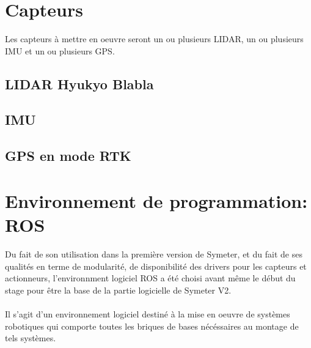 \documentclass[12pt,a4paper]{report}
\begin{document}
	\section{Capteurs}
		Les capteurs à mettre en oeuvre seront un ou plusieurs LIDAR, un ou plusieurs IMU et un ou plusieurs GPS.
		\subsection{LIDAR Hyukyo Blabla}
		
		\subsection{IMU}
		
		\subsection{GPS en mode RTK}
		
		
		
		
	\section{Environnement de programmation: ROS}
	Du fait de son utilisation dans la première version de Symeter, et du fait de ses qualités en terme de modularité, de disponibilité des drivers pour les capteurs et actionneurs, l'environnment logiciel ROS a été choisi avant même le début du stage pour être la base de la partie logicielle de Symeter V2.
		
	\paragraph*{} Il s'agit d'un environnement logiciel destiné à la mise en oeuvre de systèmes robotiques qui comporte toutes les briques de bases nécéssaires au montage de tels systèmes.
		
\end{document}
